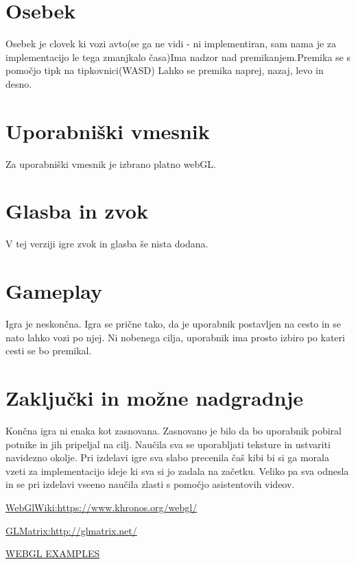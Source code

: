 \documentclass[a4paper]{article}
\begin{document}
\section{Osebek}
Osebek je clovek ki vozi avto(se ga ne vidi - ni implementiran, sam nama je za implementacijo le tega zmanjkalo časa)Ima nadzor nad premikanjem.Premika se s pomočjo tipk na tipkovnici(WASD) Lahko se premika naprej, nazaj, levo in desno.

\section{Uporabniški vmesnik}
Za uporabniški vmesnik je izbrano platno webGL.

\section{Glasba in zvok}
V tej verziji igre zvok in glasba še nista dodana.

\section{Gameplay}
Igra je neskončna. Igra se prične tako, da je uporabnik postavljen na cesto in se nato lahko vozi po njej. Ni nobenega cilja, uporabnik ima prosto izbiro po kateri cesti se bo premikal.



\section{Zaključki in možne nadgradnje}
Končna igra ni enaka kot zasnovana. Zasnovano je bilo da bo uporabnik pobiral potnike in jih pripeljal na cilj.
Naučila sva se uporabljati teksture in ustvariti navidezno okolje. Pri izdelavi igre sva slabo precenila čaš kibi bi si ga morala vzeti za implementacijo ideje ki sva si jo zadala na začetku. Veliko pa sva odnesla in se pri izdelavi vseeno naučila zlasti s pomočjo asistentovih videov.


\small




\href{https://www.khronos.org/webgl/wiki/Main_Pag}{WebGlWiki:https://www.khronos.org/webgl/}


\href{http://glmatrix.net/}{GLMatrix:http://glmatrix.net/}

\href{https://www.youtube.com/watch?v=AsKf-BQqIk4&list=PLpOjccKU6Yiz4tcDpOqaZdPQGP8gfaWQr}{WEBGL EXAMPLES}
\end{document}

